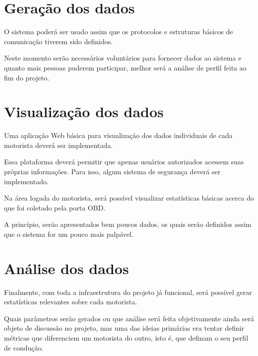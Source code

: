 \section{Geração dos dados}
O sistema poderá ser usado assim que os protocolos e estruturas básicos de comunicação tiverem sido definidos. 

Neste momento serão necessários voluntários para fornecer dados ao sistema e quanto mais pessoas puderem participar, melhor será a análise de perfil feita ao fim do projeto.

\section{Visualização dos dados}
Uma aplicação Web básica para visualização dos dados individuais de cada motorista deverá ser implementada.

Essa plataforma deverá permitir que apenas usuários autorizados acessem suas próprias informações. Para isso, algum sistema de segurança deverá ser implementado.

Na área logada do motorista, será possível visualizar estatísticas básicas acerca do que foi coletado pela porta OBD.

A princípio, serão apresentados bem poucos dados, os quais serão definidos assim que o sistema for um pouco mais palpável. 

\section{Análise dos dados}
Finalmente, com toda a infraestrutura do projeto já funcional, será possível gerar estatísticas relevantes sobre cada motorista.

Quais parâmetros serão gerados ou que análise será feita objetivamente ainda será objeto de discussão no projeto, mas uma das ideias primárias era tentar definir métricas que diferenciem um motorista do outro, isto é, que definam o seu perfil de condução.